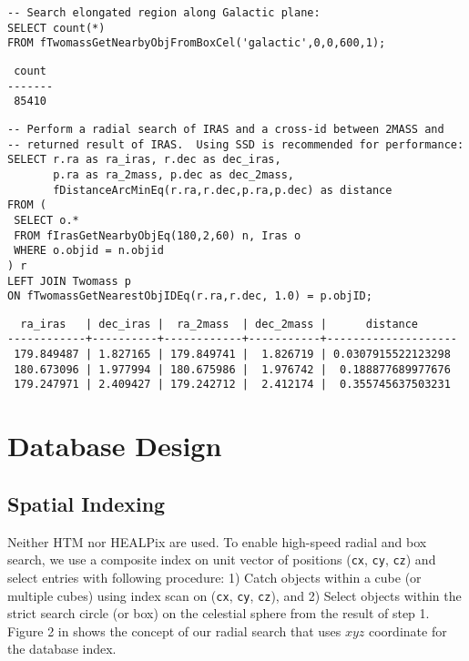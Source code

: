 \documentclass[11pt,twoside]{article}
\begin{document}
\begin{verbatim}
-- Search elongated region along Galactic plane:
SELECT count(*) 
FROM fTwomassGetNearbyObjFromBoxCel('galactic',0,0,600,1);
\end{verbatim}

{\small
\begin{verbatim}
 count 
-------
 85410
\end{verbatim}
}

{\small
\begin{verbatim}
-- Perform a radial search of IRAS and a cross-id between 2MASS and
-- returned result of IRAS.  Using SSD is recommended for performance:
SELECT r.ra as ra_iras, r.dec as dec_iras,
       p.ra as ra_2mass, p.dec as dec_2mass,
       fDistanceArcMinEq(r.ra,r.dec,p.ra,p.dec) as distance
FROM (
 SELECT o.*
 FROM fIrasGetNearbyObjEq(180,2,60) n, Iras o
 WHERE o.objid = n.objid
) r
LEFT JOIN Twomass p
ON fTwomassGetNearestObjIDEq(r.ra,r.dec, 1.0) = p.objID;
\end{verbatim}
}

{\small
\begin{verbatim}
  ra_iras   | dec_iras |  ra_2mass  | dec_2mass |      distance      
------------+----------+------------+-----------+--------------------
 179.849487 | 1.827165 | 179.849741 |  1.826719 | 0.0307915522123298
 180.673096 | 1.977994 | 180.675986 |  1.976742 |  0.188877689977676
 179.247971 | 2.409427 | 179.242712 |  2.412174 |  0.355745637503231
\end{verbatim}
}


\section{Database Design}

\subsection{Spatial Indexing}

Neither HTM \citep{kun_2000} nor HEALPix \citep{gor_2005} are used.
To enable high-speed radial and box search,
we use a composite index on unit vector of positions 
({\tt cx}, {\tt cy}, {\tt cz}) and select entries with following procedure:
1) Catch objects within a cube (or multiple cubes) 
using index scan on ({\tt cx}, {\tt cy}, {\tt cz}), and
2) Select objects within the strict search circle (or box) on the celestial
sphere from the result of step 1.
Figure 2 in \citet{yam_2011a} shows the concept of our radial search
that uses $x$$y$$z$ coordinate for the database index.
\end{document}
